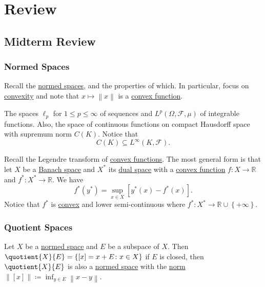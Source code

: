 \chapter{Review}
\section{Midterm Review}\label{sec:mid-review}
\subsection{Normed Spaces}
Recall the \hyperref[def:normed-vector-space]{normed spaces}, and the properties of which. In particular, focus on \hyperref[def:convex-function]{convexity} and note that \(x\mapsto \left\lVert x\right\rVert \) is a \hyperref[def:convex-function]{convex function}.

\begin{eg}
	The spaces \(\ell _p\) for \(1 \leq p \leq \infty \) of sequences and \(L^p(\Omega , \mathcal{F} , \mu )\) of integrable functions. Also, the space of continuous functions on compact Hausdorff space with supremum norm \(C(K)\). Notice that
	\[
		C(K) \subseteq L^{\infty} (K, \mathcal{F}).
	\]
\end{eg}

\begin{remark}
	Recall the Legendre transform of \hyperref[def:convex-function]{convex functions}. The most general form is that let \(X\) be a \hyperref[def:Banach-space]{Banach space} and \(X^{\ast} \) its \hyperref[def:dual-space]{dual space} with a \hyperref[def:convex-function]{convex function} \(f\colon X\to \mathbb{R} \) and \(f^{\ast} \colon X^{\ast} \to \mathbb{R} \). We have
	\[
		f^{\ast} (y^{\ast} ) = \sup _{x\in X}\left[ y^{\ast} (x) - f^{\ast} (x) \right].
	\]
	Notice that \(f^{\ast} \) is \hyperref[def:convex-function]{convex} and lower semi-continuous where \(f^{\ast} \colon X^{\ast} \to \mathbb{R} \cup \left\{ +\infty  \right\} \).
\end{remark}

\subsection{Quotient Spaces}
Let \(X\) be a \hyperref[def:normed-vector-space]{normed space} and \(E\) be a subspace of \(X\). Then \(\quotient{X}{E} = \left\{ [x] = x+E\colon x\in X \right\}  \) if \(E\) is closed, then \(\quotient{X}{E} \) is also a \hyperref[def:normed-vector-space]{normed space} with the \hyperref[def:norm]{norm} \(\left\lVert [x]\right\rVert \coloneqq \inf _{y\in E}\left\lVert x- y\right\rVert\).

